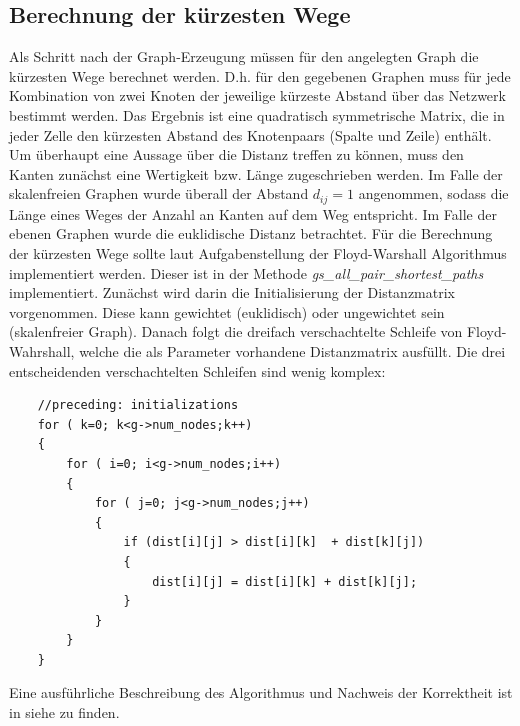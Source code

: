 \documentclass[10pt]{article}
\begin{document}
\subsection{Berechnung der kürzesten Wege}
Als Schritt nach der Graph-Erzeugung müssen für den angelegten Graph die kürzesten Wege berechnet werden. D.h. für den gegebenen Graphen muss für jede Kombination von zwei Knoten der jeweilige kürzeste Abstand über das Netzwerk bestimmt werden. Das Ergebnis ist eine quadratisch symmetrische Matrix, die in jeder Zelle den kürzesten Abstand des Knotenpaars (Spalte und Zeile) enthält. 
Um überhaupt eine Aussage über die Distanz treffen zu können, muss den Kanten zunächst eine Wertigkeit bzw. Länge zugeschrieben werden. Im Falle der skalenfreien Graphen wurde überall der Abstand $d_{ij}=1$ angenommen, sodass die Länge eines Weges der Anzahl an Kanten auf dem Weg entspricht. Im Falle der ebenen Graphen wurde die euklidische Distanz betrachtet. Für die Berechnung der kürzesten Wege sollte laut Aufgabenstellung der Floyd-Warshall Algorithmus implementiert werden. Dieser ist in der Methode \textit{gs\_all\_pair\_shortest\_paths} implementiert. Zunächst wird darin die Initialisierung der Distanzmatrix vorgenommen. Diese kann gewichtet (euklidisch) oder ungewichtet sein (skalenfreier Graph). Danach folgt die dreifach verschachtelte Schleife von Floyd-Wahrshall, welche die als Parameter vorhandene Distanzmatrix ausfüllt.  Die drei entscheidenden verschachtelten Schleifen sind wenig komplex:
\begin{lstlisting}
    //preceding: initializations
    for ( k=0; k<g->num_nodes;k++)
    {
        for ( i=0; i<g->num_nodes;i++)
        {
            for ( j=0; j<g->num_nodes;j++)
            {
                if (dist[i][j] > dist[i][k]  + dist[k][j])
                {
                    dist[i][j] = dist[i][k] + dist[k][j];
                }
            }
        }
    }
\end{lstlisting}
Eine ausführliche Beschreibung des Algorithmus und Nachweis der Korrektheit ist in siehe \cite{Floyd} zu finden.
\end{document}
